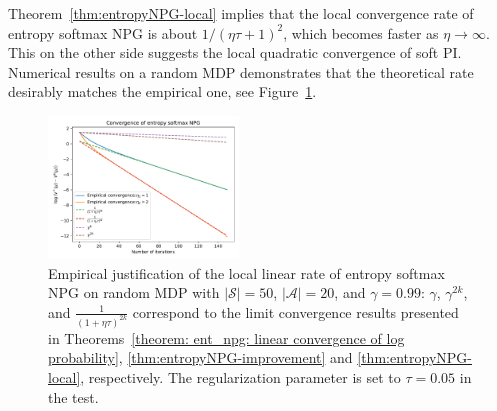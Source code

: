 \begin{remark}
    Theorem~\ref{thm:entropyNPG-local} implies that the local convergence rate of entropy softmax NPG is about ${1}/{(\eta\tau+1)^2}$, which becomes faster as $\eta\rightarrow \infty$. This on the other side suggests the local quadratic convergence of soft PI.
    Numerical results on a random MDP demonstrates that the theoretical rate desirably matches the empirical one, see Figure~\ref{fig:entropynpg}. 
\end{remark}

\begin{figure}[ht!]
    \centering
    \includegraphics[width=0.45\textwidth]{EntropyNPG.pdf}
    \caption{Empirical justification of the local linear rate of entropy softmax NPG on random MDP with $|\mathcal{S}|=50$, $|\mathcal{A}|=20$, and $\gamma=0.99$: $\gamma$, $\gamma^{2k}$, and $\frac{1}{(1+\eta\tau)^{2k}}$ correspond to the limit convergence results presented in Theorems~\ref{theorem: ent_npg: linear convergence of log probability}, \ref{thm:entropyNPG-improvement} and \ref{thm:entropyNPG-local}, respectively. The regularization parameter is set to $\tau=0.05$ in the test.}
    \label{fig:entropynpg}
\end{figure}